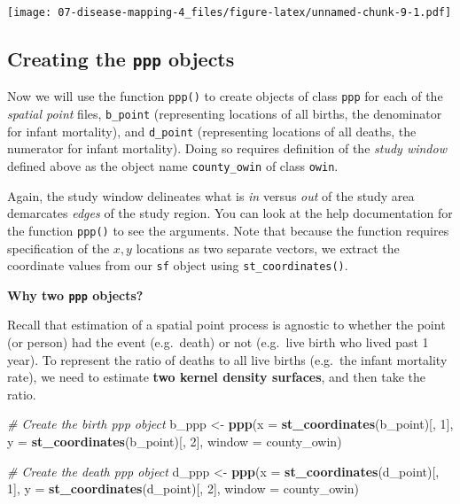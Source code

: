 \documentclass[
]{book}
\newenvironment{Shaded}{\begin{snugshade}}{\end{snugshade}}
\newcommand{\AttributeTok}[1]{\textcolor[rgb]{0.13,0.29,0.53}{#1}}
\newcommand{\CommentTok}[1]{\textcolor[rgb]{0.56,0.35,0.01}{\textit{#1}}}
\newcommand{\DecValTok}[1]{\textcolor[rgb]{0.00,0.00,0.81}{#1}}
\newcommand{\FunctionTok}[1]{\textcolor[rgb]{0.13,0.29,0.53}{\textbf{#1}}}
\newcommand{\NormalTok}[1]{#1}
\newcommand{\OtherTok}[1]{\textcolor[rgb]{0.56,0.35,0.01}{#1}}
\newenvironment{rmdnote}[1]
  {
  \begin{itemize}
  \renewcommand{\labelitemi}{
    \raisebox{-.7\height}[0pt][0pt]{
      {\setkeys{Gin}{width=3em,keepaspectratio}\texttt{[image: images/\#1]}}
    }
  }
  \setlength{\fboxsep}{1em}
  \begin{note}
  \item
  }
  {
  \end{note}
  \end{itemize}
  }
\begin{document}
\texttt{[image: 07-disease-mapping-4\_files/figure-latex/unnamed-chunk-9-1.pdf]}

\hypertarget{creating-the-ppp-objects}{%
\subsection{\texorpdfstring{Creating the \texttt{ppp} objects}{Creating the ppp objects}}\label{creating-the-ppp-objects}}

Now we will use the function \texttt{ppp()} to create objects of class \texttt{ppp} for each of the \emph{spatial point} files, \texttt{b\_point} (representing locations of all births, the denominator for infant mortality), and \texttt{d\_point} (representing locations of all deaths, the numerator for infant mortality). Doing so requires definition of the \emph{study window} defined above as the object name \texttt{county\_owin} of class \texttt{owin}.

Again, the study window delineates what is \emph{in} versus \emph{out} of the study area demarcates \emph{edges} of the study region. You can look at the help documentation for the function \texttt{ppp()} to see the arguments. Note that because the function requires specification of the \(x,y\) locations as two separate vectors, we extract the coordinate values from our \texttt{sf} object using \texttt{st\_coordinates()}.

\begin{rmdnote}{note}
\textbf{Why two \texttt{ppp} objects?}

Recall that estimation of a spatial point process is agnostic to whether the point (or person) had the event (e.g.~death) or not (e.g.~live birth who lived past 1 year). To represent the ratio of deaths to all live births (e.g.~the infant mortality rate), we need to estimate \textbf{two kernel density surfaces}, and then take the ratio.

\end{rmdnote}

\begin{Shaded}
\begin{Highlighting}[]
\CommentTok{\# Create the birth ppp object}
\NormalTok{b\_ppp }\OtherTok{\textless{}{-}} \FunctionTok{ppp}\NormalTok{(}\AttributeTok{x =} \FunctionTok{st\_coordinates}\NormalTok{(b\_point)[, }\DecValTok{1}\NormalTok{], }
             \AttributeTok{y =} \FunctionTok{st\_coordinates}\NormalTok{(b\_point)[, }\DecValTok{2}\NormalTok{],}
             \AttributeTok{window =}\NormalTok{ county\_owin)}

\CommentTok{\# Create the death ppp object}
\NormalTok{d\_ppp }\OtherTok{\textless{}{-}} \FunctionTok{ppp}\NormalTok{(}\AttributeTok{x =} \FunctionTok{st\_coordinates}\NormalTok{(d\_point)[, }\DecValTok{1}\NormalTok{], }
             \AttributeTok{y =} \FunctionTok{st\_coordinates}\NormalTok{(d\_point)[, }\DecValTok{2}\NormalTok{],}
             \AttributeTok{window =}\NormalTok{ county\_owin)}
\end{Highlighting}
\end{Shaded}
\end{document}
